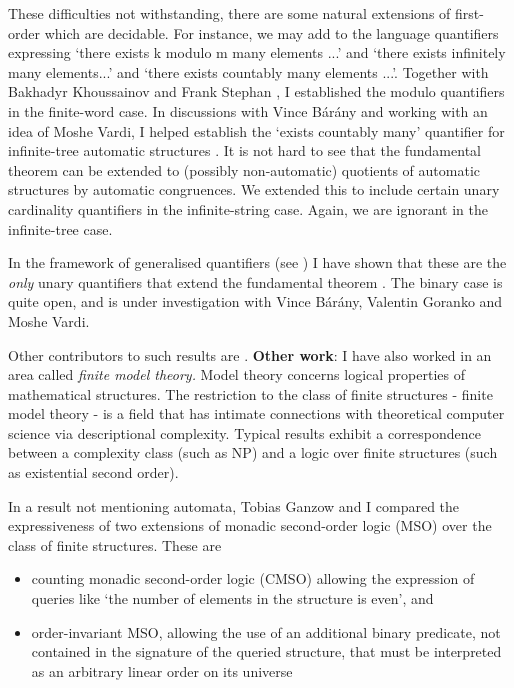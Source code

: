 \documentclass[12pt]{article}
\theoremstyle{plain} \numberwithin{equation}{section}
\theoremstyle{definition}
\begin{document}
These difficulties not withstanding, there are some natural extensions of first-order which are decidable. For instance, we may add to the language quantifiers expressing `there exists k modulo m many elements ...' and `there exists infinitely many elements...' and `there exists countably many elements ...'. Together with Bakhadyr Khoussainov and Frank Stephan \cite{KRS04}, I established the modulo quantifiers in the finite-word case. In discussions with Vince B{\'a}r{\'a}ny  and working with an idea of Moshe Vardi, I helped establish the `exists countably many' quantifier for infinite-tree automatic structures \cite{BKRa}. 
It is not hard to see that the fundamental theorem can be extended to (possibly non-automatic) quotients of automatic structures by automatic congruences. We extended this to include certain unary cardinality quantifiers \cite{BKRu08} in the infinite-string case. Again, we are ignorant in the infinite-tree case. 

In the framework of generalised quantifiers (see \cite{Hell89}) I have shown that these are the {\em only} unary quantifiers that extend the fundamental theorem \cite{Rubi08}. The binary case is quite open, and is under investigation with Vince B\'ar\'any, Valentin Goranko and Moshe Vardi.

Other contributors to such results are \cite{Blum99, Colc04, KuLo05}.
\iffalse
{\bf Other work}: I have also worked in an area called {\em finite model theory.} Model theory concerns logical properties of mathematical structures. The restriction to the class of finite structures -  finite model theory -  is a field that has intimate connections with theoretical computer science via descriptional complexity. Typical results exhibit a correspondence between a complexity class (such as NP) and a logic over finite structures (such as existential second order).

In a result not mentioning automata, Tobias Ganzow and I compared the expressiveness of two extensions of monadic second-order logic (MSO) over the class of finite structures. These are

\begin{itemize}
\item counting monadic second-order logic (CMSO) allowing the expression of queries like `the number of elements in the structure is even', and
\item order-invariant MSO, allowing the use of an additional binary predicate, not contained in the signature of the queried structure, that must be interpreted as an arbitrary linear order on its universe
\end{itemize}
\end{document}
